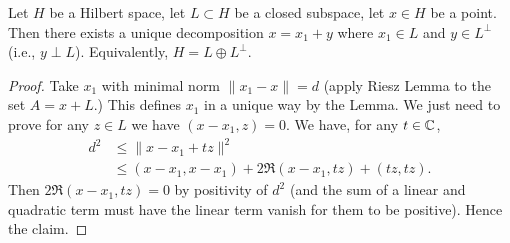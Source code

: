 \begin{theorem}\label{thm:riesz-projection}
Let $H$ be a Hilbert space, let $L\subset H$ be a closed subspace, let
$x\in H$ be a point. Then there exists a unique decomposition $x=x_{1}+y$
where $x_{1}\in L$ and $y\in L^{\perp}$ (i.e., $y\perp L$).
Equivalently, $H=L\oplus L^{\perp}$.
\end{theorem}

\begin{proof}
Take $x_{1}$ with minimal norm $\|x_{1}-x\|=d$ (apply Riesz Lemma to
the set $A=x+L$.) This defines $x_{1}$ in a unique way by the
Lemma. We just need to prove for any $z\in L$ we have $(x-x_{1},z)=0$.
We have, for any $t\in\mathbb{C}$,
\begin{subequations}
  \begin{align}
d^{2} &\leq\|x-x_{1}+tz\|^{2}\\
&\leq (x-x_{1},x-x_{1}) + 2\Re(x-x_{1},tz)+(tz,tz).
  \end{align}
\end{subequations}
Then $2\Re(x-x_{1},tz)=0$ by positivity of $d^{2}$ (and the sum of a
linear and quadratic term must have the linear term vanish for them to
be positive). Hence the claim.
\end{proof}